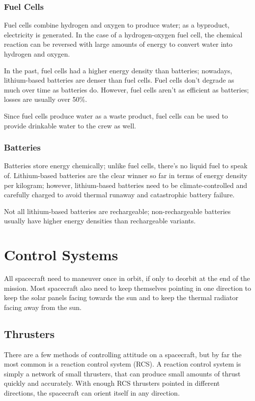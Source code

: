 \subsubsection{Fuel Cells}

Fuel cells combine hydrogen and oxygen to produce water; as a
byproduct, electricity is generated. In the case of a hydrogen-oxygen
fuel cell, the chemical reaction can be reversed with large amounts of
energy to convert water into hydrogen and oxygen.

In the past, fuel cells had a higher energy density than batteries;
nowadays, lithium-based batteries are denser than fuel cells. Fuel
cells don't degrade as much over time as batteries do. However, fuel
cells aren't as efficient as batteries; losses are usually over 50\%.

Since fuel cells produce water as a waste product, fuel cells can be
used to provide drinkable water to the crew as well.

\subsubsection{Batteries}

Batteries store energy chemically; unlike fuel cells, there's no
liquid fuel to speak of. Lithium-based batteries are the clear winner
so far in terms of energy density per kilogram; however, lithium-based
batteries need to be climate-controlled and carefully charged to avoid
thermal runaway and catastrophic battery failure.

Not all lithium-based batteries are rechargeable; non-rechargeable
batteries usually have higher energy densities than rechargeable
variants.

\section{Control Systems}

All spacecraft need to maneuver once in orbit, if only to deorbit at
the end of the mission. Most spacecraft also need to keep themselves
pointing in one direction to keep the solar panels facing towards the
sun and to keep the thermal radiator facing away from the sun.

\subsection{Thrusters}

There are a few methods of controlling attitude on a spacecraft, but
by far the most common is a reaction control system (RCS). A reaction
control system is simply a network of small thrusters, that can
produce small amounts of thrust quickly and accurately. With enough
RCS thrusters pointed in different directions, the spacecraft can
orient itself in any direction.

